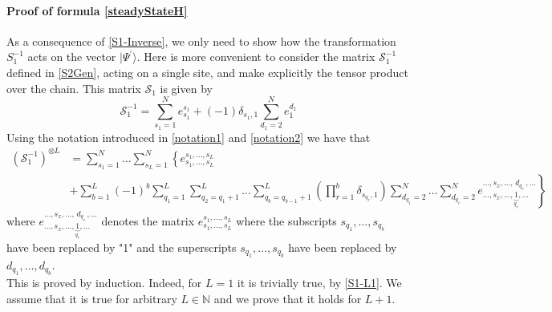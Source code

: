 \documentclass[11pt]{article}
\numberwithin{equation}{section}
\numberwithin{equation}{subsection}
\begin{document}
\paragraph{Proof of formula \eqref{steadyStateH}} As a consequence of \eqref{S1-Inverse}, we only need to show how the transformation $S_{1}^{-1}$ acts on the vector $|\Psi^{'}\rangle$. Here is more convenient to consider the matrix $\mathcal{S}_{1}^{-1}$ defined in \eqref{S2Gen}, acting on a single site, and make explicitly the tensor product over the chain. This matrix $\mathcal{S}_{1}$ is given by
\begin{equation}\label{S1-L1}
	\mathcal{S}_{1}^{-1}=\sum_{s_{1}=1}^{N}e_{s_{1}}^{s_{1}}+(-1)\delta_{s_{1},1}\sum_{d_{1}=2}^{N}e_{1}^{d_{1}}
\end{equation}
Using the notation introduced in \eqref{notation1} and \eqref{notation2} we have that 
\begin{equation}
	\begin{split}
		\left(\mathcal{S}_{1}^{-1}\right)^{\otimes L}&=\sum_{s_{1}=1}^{N}\ldots\sum_{s_{L}=1}^{N}\left\{e_{s_{1},\ldots,s_{L}}^{s_{1},\ldots,s_{L}}\right.
		\\&
		+\left.\sum_{b=1}^{L}(-1)^{b}\sum_{q_{1}=1}^{L}\sum_{q_{2}=q_{1}+1}^{L}\ldots\sum_{q_{b}=q_{b-1}+1}^{L}\left(\prod_{r=1}^{b}\delta_{s_{q_{r}},1}\right)\sum_{d_{q_{1}}=2}^{N}\ldots\sum_{d_{q_{r}}=2}^{N}e_{\ldots,s_{x},\ldots,\underbrace{1}_{q_{r}},\ldots}^{\ldots,s_{x},\ldots,\,d_{q_{r}}\,,\ldots}\right\} 
	\end{split}
\end{equation}
where $e_{\ldots,s_{x},\ldots,\underbrace{1}_{q_{r}},\ldots}^{\ldots,s_{x},\ldots,\,d_{q_{r}}\,,\ldots}$ denotes the matrix $e_{s_{1},\ldots,s_{L}}^{s_{1},\ldots,s_{L}}$ where the subscripts $s_{q_{1}},\ldots,s_{q_{b}}$ have been replaced by "1" and the superscripts $s_{q_{1}},\ldots,s_{q_{b}}$ have been replaced by $d_{q_{1}},\ldots,d_{q_{b}}$. \\
This is proved by induction. Indeed, for $L=1$ it is trivially true, by \eqref{S1-L1}. We assume that it is true for arbitrary $L\in \mathbb{N}$ and we prove that it holds for $L+1$. 
\end{document}
